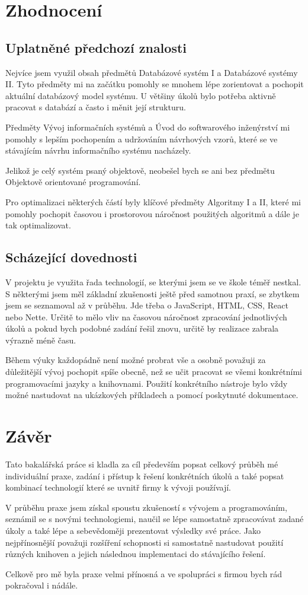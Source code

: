 \chapter{Zhodnocení}
\section{Uplatněné předchozí znalosti}
Nejvíce jsem využil obsah předmětů Databázové systém I a Databázové systémy II. Tyto předměty mi na začátku pomohly se mnohem lépe zorientovat a pochopit aktuální databázový model systému. U většiny úkolů bylo potřeba aktivně pracovat s databází a často i měnit její strukturu.

Předměty Vývoj informačních systémů a Úvod do softwarového inženýrství mi pomohly s lepším pochopením a udržováním návrhových vzorů, které se ve stávajícím návrhu informačního systému nacházely. 

Jelikož je celý systém psaný objektově, neobešel bych se ani bez předmětu Objektově orientované programování.

Pro optimalizaci některých částí byly klíčové předměty Algoritmy I a II, které mi pomohly pochopit časovou i prostorovou náročnost použitých algoritmů a dále je tak optimalizovat.


\section{Scházející dovednosti}

V projektu je využita řada technologií, se kterými jsem se ve škole téměř nestkal. S některými jsem měl základní zkušenosti ještě před samotnou praxí, se zbytkem jsem se seznamoval až v průběhu. Jde třeba o JavaScript, HTML, CSS, React nebo Nette. Určitě to mělo vliv na časovou náročnost zpracování jednotlivých úkolů a pokud bych podobné zadání řešil znovu, určitě by realizace zabrala výrazně méně času.

Během výuky každopádně není možné probrat vše a osobně považuji za důležitější vývoj pochopit spíše obecně, než se učit pracovat se všemi konkrétními programovacími jazyky a knihovnami. Použití konkrétního nástroje bylo vždy možné nastudovat na ukázkových příkladech a pomocí poskytnuté dokumentace.

\chapter{Závěr}
Tato bakalářská práce si kladla za cíl především popsat celkový průběh mé individuální praxe, zadání i přístup k řešení konkrétních úkolů a také popsat kombinací technologií které se uvnitř firmy k vývoji používají.

V průběhu praxe jsem získal spoustu zkušeností s vývojem a programováním, seznámil se s novými technologiemi, naučil se lépe samostatně zpracovávat zadané úkoly a také lépe a sebevědoměji prezentovat výsledky své práce. 
Jako nejpřínosnější považuji rozšíření schopnosti si samostatně nastudovat použití různých knihoven a jejich následnou implementaci do stávajícího řešení. 

Celkově pro mě byla praxe velmi přínosná a ve spolupráci s firmou bych rád pokračoval i nádále.
\endinput